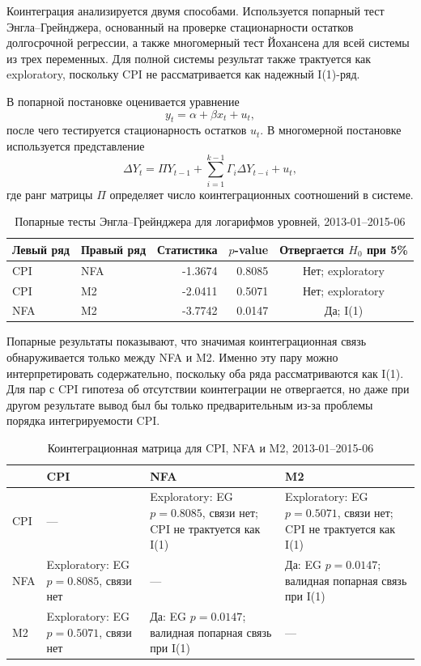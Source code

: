 \documentclass[12pt,a4paper]{article}
\begin{document}
Коинтеграция анализируется двумя способами. Используется попарный тест Энгла--Грейнджера,
основанный на проверке стационарности остатков долгосрочной регрессии, а также многомерный
тест Йохансена для всей системы из трех переменных. Для полной системы результат также
трактуется как exploratory, поскольку CPI не рассматривается как надежный I(1)-ряд.

В попарной постановке оценивается уравнение
\[
y_t = \alpha + \beta x_t + u_t,
\]
после чего тестируется стационарность остатков $u_t$. В многомерной постановке используется
представление
\[
\Delta Y_t = \Pi Y_{t-1} + \sum_{i=1}^{k-1}\Gamma_i \Delta Y_{t-i} + u_t,
\]
где ранг матрицы $\Pi$ определяет число коинтеграционных соотношений в системе.

\begin{table}[H]
\centering
\caption{Попарные тесты Энгла--Грейнджера для логарифмов уровней, 2013-01--2015-06}
\begin{tabular}{llrrc}
\toprule
Левый ряд & Правый ряд & Статистика & $p$-value & Отвергается $H_0$ при 5\% \\
\midrule
CPI & NFA & -1.3674 & 0.8085 & Нет; exploratory \\
CPI & M2 & -2.0411 & 0.5071 & Нет; exploratory \\
NFA & M2 & -3.7742 & 0.0147 & Да; I(1) \\
\bottomrule
\end{tabular}
\end{table}

Попарные результаты показывают, что значимая коинтеграционная связь обнаруживается только
между NFA и M2. Именно эту пару можно интерпретировать содержательно, поскольку оба ряда
рассматриваются как I(1). Для пар с CPI гипотеза об отсутствии коинтеграции не отвергается,
но даже при другом результате вывод был бы только предварительным из-за проблемы порядка
интегрируемости CPI.

\begin{table}[H]
\centering
\caption{Коинтеграционная матрица для CPI, NFA и M2, 2013-01--2015-06}
\small
\begin{adjustbox}{max width=\textwidth}
\begin{tabularx}{\textwidth}{lYYY}
\toprule
 & CPI & NFA & M2 \\
\midrule
CPI & --- & Exploratory: EG $p=0.8085$, связи нет; CPI не трактуется как I(1) & Exploratory: EG $p=0.5071$, связи нет; CPI не трактуется как I(1) \\
NFA & Exploratory: EG $p=0.8085$, связи нет & --- & Да: EG $p=0.0147$; валидная попарная связь при I(1) \\
M2 & Exploratory: EG $p=0.5071$, связи нет & Да: EG $p=0.0147$; валидная попарная связь при I(1) & --- \\
\bottomrule
\end{tabularx}
\end{adjustbox}
\normalsize
\end{table}
\end{document}
